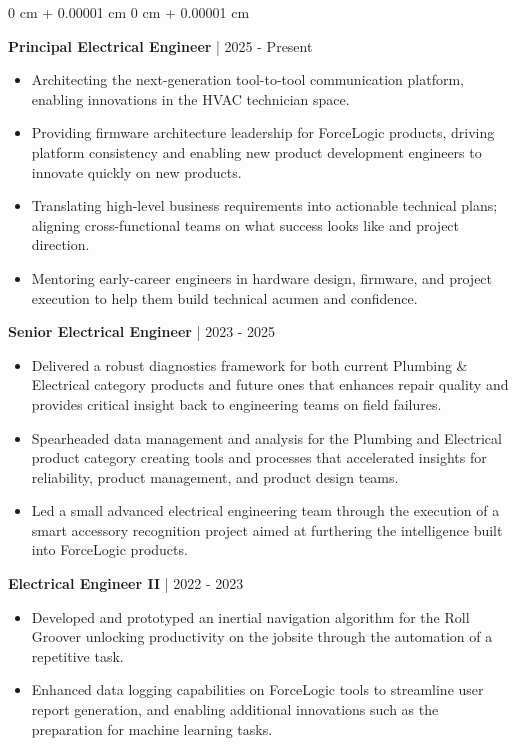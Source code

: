 \documentclass[10pt, letterpaper]{article}
\newenvironment{highlights}{
    \begin{itemize}[
        topsep=0.10 cm,
        parsep=0.10 cm,
        partopsep=0pt,
        itemsep=0pt,
        leftmargin=0 cm + 10pt
    ]
}{
    \end{itemize}
} %
\newenvironment{onecolentry}{
    \begin{adjustwidth}{
        0 cm + 0.00001 cm
    }{
        0 cm + 0.00001 cm
    }
}{
    \end{adjustwidth}
} %
\begin{document}
        \vspace{0.10 cm}
        \begin{onecolentry}
        \textbf{Principal Electrical Engineer} | 2025 - Present
            \begin{highlights}
                \item Architecting the next-generation tool-to-tool communication platform, enabling innovations in the HVAC technician space.
                \item Providing firmware architecture leadership for ForceLogic products, driving platform consistency and enabling new product development engineers to innovate quickly on new products.
                \item Translating high-level business requirements into actionable technical plans; aligning cross-functional teams on what success looks like and project direction.
                \item Mentoring early-career engineers in hardware design, firmware, and project execution to help them build technical acumen and confidence.
            \end{highlights}
        \textbf{Senior Electrical Engineer} | 2023 - 2025
            \begin{highlights}
                \item Delivered a robust diagnostics framework for both current Plumbing \& Electrical category products and future ones that enhances repair quality and provides critical insight back to engineering teams on field failures.
                \item Spearheaded data management and analysis for the Plumbing and Electrical product category creating tools and processes that accelerated insights for reliability, product management, and product design teams.
                \item Led a small advanced electrical engineering team through the execution of a smart accessory recognition project aimed at furthering the intelligence built into ForceLogic products.
            \end{highlights}
        \textbf{Electrical Engineer II} | 2022 - 2023
            \begin{highlights}
                \item Developed and prototyped an inertial navigation algorithm for the Roll Groover unlocking productivity on the jobsite through the automation of a repetitive task.
                \item Enhanced data logging capabilities on ForceLogic tools to streamline user report generation, and enabling additional innovations such as the preparation for machine learning tasks.

\end{highlights}
\end{onecolentry}
\end{document}
